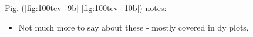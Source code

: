 	Fig. (\eqref{fig:100tev_9b}-\eqref{fig:100tev_10b}) notes:

	\begin{itemize}
		\item Not much more to say about these - mostly covered in dy plots,
	\end{itemize}

